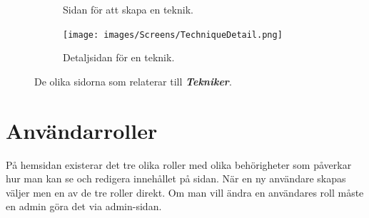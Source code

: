 \documentclass{article}
\newcommand{\term}[1]{\textcolor{secondary}{\textit{\textbf{#1}}}}
\begin{document}
{\begin{figure}[h]
{\begin{subfigure}[b]{0.25\textwidth}
                     \caption{Sidan för att skapa en teknik.}
                     \label{fig:techniqueCreate}
                \end{subfigure}
                \hfill
                \begin{subfigure}[b]{0.25\textwidth}
                     \centering
                     \texttt{[image: images/Screens/TechniqueDetail.png]}
                     \caption{Detaljsidan för en teknik.}
                     \label{fig:techniqueDetail}
                \end{subfigure}
                }
            \caption{De olika sidorna som relaterar till \term{Tekniker}.}
            \label{fig:techniquesFig}
        \end{figure}
\newpage
\section{Användarroller}
    På hemsidan existerar det tre olika roller med olika behörigheter som påverkar hur man kan se och redigera innehållet på sidan. När en ny användare skapas väljer men en av de tre roller direkt. Om man vill ändra en användares roll måste en admin göra det via admin-sidan.

}
\end{document}
